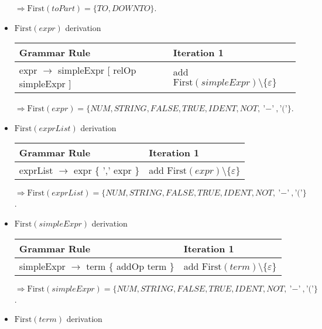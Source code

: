\documentclass[8pt]{scrartcl}
\newcommand{\First}[1]{\mathrm{First}(#1)}
\newcommand{\epsset}{\{\varepsilon\}}
\begin{document}
\begin{itemize}
\begin{tabular}{|l |l |}
                    \hline
                \end{tabular}\newline
                $\Rightarrow \First{toPart} = \{TO,DOWNTO\}$.
            \item $\First{expr}$ derivation\newline
                \begin{tabular}{|l |l |}
                    \hline
                    \textbf{Grammar Rule} & \textbf{Iteration 1}\\
                    \hline
                    expr $\rightarrow$ simpleExpr [ relOp simpleExpr ] & add $\First{simpleExpr} \setminus \epsset$\\
                    \hline
                \end{tabular}\newline
                $\Rightarrow \First{expr} = \{NUM, STRING, FALSE, TRUE, IDENT, NOT, \text{'$-$'}, \text{'$($'}\}$.
            \item $\First{exprList}$ derivation\newline
                \begin{tabular}{|l |l |}
                    \hline
                    \textbf{Grammar Rule} & \textbf{Iteration 1}\\
                    \hline
                    exprList $\rightarrow$ expr \{ ',' expr \} & add $\First{expr} \setminus \epsset$\\
                    \hline
                \end{tabular}\newline
                $\Rightarrow \First{exprList} = \{NUM, STRING, FALSE, TRUE, IDENT, NOT, \text{'$-$'}, \text{'$($'}\}$.
            \item $\First{simpleExpr}$ derivation\newline
                \begin{tabular}{|l |l |}
                    \hline
                    \textbf{Grammar Rule} & \textbf{Iteration 1}\\
                    \hline
                    simpleExpr $\rightarrow$ term \{ addOp term \} & add $\First{term} \setminus \epsset$\\
                    \hline
                \end{tabular}\newline
                $\Rightarrow \First{simpleExpr} = \{NUM, STRING, FALSE, TRUE, IDENT, NOT, \text{'$-$'}, \text{'$($'}\}$.
            \item $\First{term}$ derivation\newline

\end{itemize}
\end{document}
